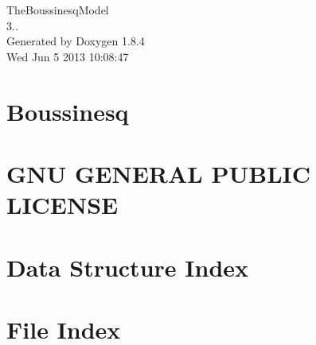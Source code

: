 \documentclass[twoside]{book}
\newcommand{\clearemptydoublepage}{%
  \newpage{\pagestyle{empty}\cleardoublepage}%
}
\begin{document}
\hypersetup{pageanchor=false}
\begin{titlepage}
\vspace*{7cm}
\begin{center}%
{\Large The\-Boussinesq\-Model \\[1ex]\large 3.. }\\
\vspace*{1cm}
{\large Generated by Doxygen 1.8.4}\\
\vspace*{0.5cm}
{\small Wed Jun 5 2013 10:08:47}\\
\end{center}
\end{titlepage}
\clearemptydoublepage
\tableofcontents
\clearemptydoublepage
{}
\hypersetup{pageanchor=true}

\chapter{Boussinesq}
\label{index}\hypertarget{index}{}
\chapter{G\-N\-U G\-E\-N\-E\-R\-A\-L P\-U\-B\-L\-I\-C L\-I\-C\-E\-N\-S\-E}
\label{page1}
\hypertarget{page1}{}

\chapter{Data Structure Index}

\chapter{File Index}

\end{document}
